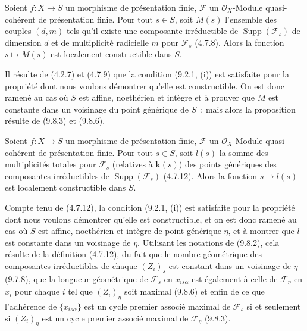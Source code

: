 
\begin{corollary}[9.8.7]
\label{IV.9.8.7-fr}
Soient $f:X\to S$ un morphisme de présentation finie, $\mathcal F$ un
$\mathcal O_X$-Module quasi-cohérent de présentation finie. Pour tout $s\in S$,
soit $M(s)$ l'ensemble des couples $(d,m)$ tels qu'il existe une composante
irréductible de $\operatorname{Supp}(\mathcal F_s)$ de dimension $d$ et de
multiplicité radicielle $m$ pour $\mathcal F_s$ (4.7.8). Alors la fonction
$s\mapsto M(s)$ est localement constructible dans $S$.
\end{corollary}

Il résulte de (4.2.7) et (4.7.9) que la condition (9.2.1, (i)) est satisfaite
pour la propriété dont nous voulons démontrer qu'elle est constructible. On est
donc ramené au cas où $S$ est affine, noethérien et intègre et à prouver que $M$
est constante dans un voisinage du point générique de $S$~; mais alors la
proposition résulte de (9.8.3) et (9.8.6).

\begin{proposition}[9.8.8]
\label{IV.9.8.8-fr}
Soient $f:X\to S$ un morphisme de présentation finie, $\mathcal F$ un
$\mathcal O_X$-Module quasi-cohérent de présentation finie. Pour tout $s\in S$,
soit $l(s)$ la somme des multiplicités totales pour $\mathcal F_s$ (relatives à
$\boldsymbol{k}(s)$) des points génériques des composantes irréductibles de
$\operatorname{Supp}(\mathcal F_s)$ (4.7.12). Alors la fonction $s\mapsto l(s)$
est localement constructible dans $S$.
\end{proposition}

Compte tenu de (4.7.12), la condition (9.2.1, (i)) est satisfaite pour la
propriété dont nous voulons démontrer qu'elle est constructible, et on est donc
ramené au cas où $S$ est affine, noethérien et intègre de point générique
$\eta$, et à montrer que $l$ est constante dans un voisinage de $\eta$.
Utilisant les notations de (9.8.2), cela résulte de la définition (4.7.12), du
fait que le nombre géométrique des composantes irréductibles de chaque
$(Z_i)_s$ est constant dans un voisinage de $\eta$ (9.7.8), que la longueur
géométrique de $\mathcal F_s$ en $x_{is\alpha}$ est également à celle de
$\mathcal F_\eta$ en $x_i$ pour chaque $i$ tel que $(Z_i)_\eta$ soit maximal
(9.8.6) et enfin de ce que l'adhérence de $\{x_{is\alpha}\}$ est un cycle
premier associé maximal de $\mathcal F_s$ si et seulement si $(Z_i)_\eta$ est
un cycle premier associé maximal de $\mathcal F_\eta$ (9.8.3).

